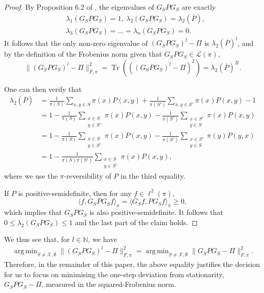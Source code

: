 \documentclass[EJP]{ejpecp} %
\DeclareMathOperator{\Tr}{Tr}
\DeclareMathOperator*{\argmin}{arg\,min}
\begin{document}
\begin{proof}
    By Proposition 6.2 of \cite{GPG}, the eigenvalues of $G_S P G_S$ are exactly 
    \begin{align*}
        &\lambda_1(G_SPG_S) = 1,\ \lambda_2(G_SPG_S) = \lambda_2(\overline{P}),\\ &\lambda_3(G_SPG_S) = \ldots = \lambda_n(G_SPG_S) = 0.
    \end{align*}
    It follows that the only non-zero eigenvalue of $(G_SPG_S)^l - \Pi$ is $\lambda_2(\overline{P})^l$, and by the definition of the Frobenius norm given that $G_SPG_S \in \mathcal{L}(\pi)$, 
    $$\|(G_SPG_S)^l - \Pi\|_{F, \pi}^2 = \Tr\left(((G_SPG_S)^l - \Pi)^2\right) = \lambda_2(\overline{P})^{2l}.$$

    One can then verify that 
    \begin{align*}
        \lambda_2(\overline{P}) &= \frac{1}{\pi(S)} \sum_{x, y \in S} \pi(x) P(x,y) + \frac{1}{\pi(S')} \sum_{x, y \in \mathcal{S'}} \pi(x) P(x,y) - 1\\
        &= 1 - \frac{1}{\pi(S)}\sum_{\substack{x \in S\\ y \in S'}}  \pi(x)P(x,y) - \frac{1}{\pi(S')}\sum_{\substack{x \in S'\\ y \in S}} \pi(x)P(x,y)\\
        &= 1 - \frac{1}{\pi(S)}\sum_{\substack{x \in S\\ y \in S'}}  \pi(x)P(x,y) - \frac{1}{\pi(S')}\sum_{\substack{x \in S'\\ y \in S}} \pi(y)P(y,x)\\
        &= 1 - \frac{1}{\pi(S)\pi(S')}\sum_{\substack{x \in S\\ y \in S'}}  \pi(x)P(x,y),
    \end{align*}
    where we use the $\pi$-reversibility of $P$ in the third equality.
    
    If $P$ is positive-semidefinite, then for any $f \in \ell^2(\pi)$, 
    $$\langle f, G_S P G_S f\rangle_\pi = \langle G_S f, PG_S f \rangle_\pi \geq 0,$$
    which implies that $G_SPG_S$ is also positive-semidefinite. It follows that $0 \leq \lambda_2(G_S P G_S) \leq 1$ and the last part of the claim holds. 
\end{proof}

We thus see that, for $l \in \mathbb{N}$, we have
\begin{align*}
    \argmin_{S \neq \mathcal{X}, \emptyset} \|(G_SPG_S)^l - \Pi\|_{F, \pi}^2 = \argmin_{S \neq \mathcal{X}, \emptyset} \|G_SPG_S - \Pi\|_{F, \pi}^2.
\end{align*}
Therefore, in the remainder of this paper, the above equality justifies the decision for us to focus on minimising the one-step deviation from stationarity, $G_S P G_S - \Pi$, measured in the squared-Frobenius norm.
\end{document}
